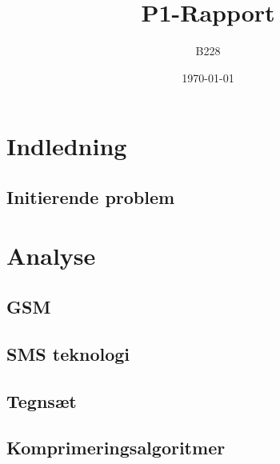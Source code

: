 \documentclass[12pt]{report}
\begin{document}
\setcounter{page}{2}


\begin{titlepage}
\title{P1-Rapport}
\author{B228}
\date{\today}
\pagebreak
\maketitle
\thispagestyle{empty}
\end{titlepage}

\tableofcontents
\thispagestyle{empty}

\renewcommand{\chaptername}{Kapitel}

\chapter{Indledning}
\setcounter{page}{3}
	
	\section{Initierende problem}
	

\chapter{Analyse}

    \section{GSM}
    

	\section{SMS teknologi}
	
	
	\section{Tegnsæt}
	
	
	\section{Komprimeringsalgoritmer}
	
	
\end{document}
